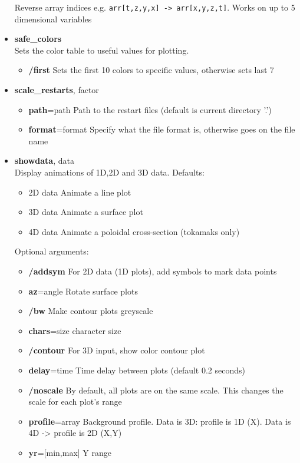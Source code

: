 \documentclass[12pt]{article}
\newcommand{\code}[1]{\texttt{#1}}
\begin{document}
\begin{itemize}
  Reverse array indices e.g. \code{arr[t,z,y,x] -> arr[x,y,z,t]}. Works on up to 5 dimensional variables
\item {\bf safe\_colors} \\
  Sets the color table to useful values for plotting.
  \begin{itemize}
  \item {\bf /first}   Sets the first 10 colors to specific values, otherwise sets last 7
  \end{itemize}
\item {\bf scale\_restarts}, factor
  \begin{itemize}
  \item {\bf path}=path  Path to the restart files (default is current directory '.')
  \item {\bf format}=format  Specify what the file format is, otherwise goes on the file name
  \end{itemize}
\item {\bf showdata}, data \\
  Display animations of 1D,2D and 3D data. Defaults:
  \begin{itemize}
  \item 2D data   Animate a line plot
  \item 3D data   Animate a surface plot
  \item 4D data   Animate a poloidal cross-section (tokamaks only)
  \end{itemize}
  Optional arguments:
  \begin{itemize}
  \item {\bf /addsym}   For 2D data (1D plots), add symbols to mark data points
  \item {\bf az}=angle       Rotate surface plots
  \item {\bf /bw} Make contour plots greyscale
  \item {\bf chars}=size character size
  \item {\bf /contour}  For 3D input, show color contour plot
  \item {\bf delay}=time     Time delay between plots (default 0.2 seconds)
  \item {\bf /noscale}       By default, all plots are on the same scale. 
    This changes the scale for each plot's range
  \item {\bf profile}=array  Background profile. Data is 3D: profile is 1D (X). 
    Data is 4D -> profile is 2D (X,Y)
  \item {\bf yr}=[min,max]   Y range
  \end{itemize}

\end{itemize}
\end{document}
